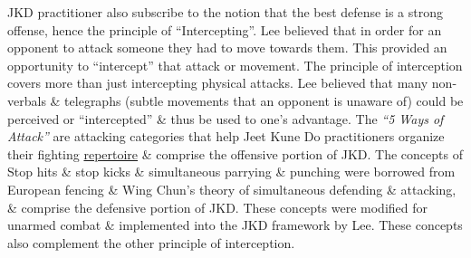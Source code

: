 \documentclass{article}
\begin{document}
JKD practitioner also subscribe to the notion that the best defense is a strong offense, hence the principle of ``Intercepting''. {\sc Lee} believed that in order for an opponent to attack someone they had to move towards them. This provided an opportunity to ``intercept'' that attack or movement. The principle of interception covers more than just intercepting physical attacks. {\sc Lee} believed that many non-verbals \& telegraphs (subtle movements that an opponent is unaware of) could be perceived or ``intercepted'' \& thus be used to one's advantage. The {\it``5 Ways of Attack''} are attacking categories that help Jeet Kune Do practitioners organize their fighting \href{https://en.wikipedia.org/wiki/Repertoire}{repertoire} \& comprise the offensive portion of JKD. The concepts of Stop hits \& stop kicks \& simultaneous parrying \& punching were borrowed from European fencing \& Wing Chun's theory of simultaneous defending \& attacking, \& comprise the defensive portion of JKD. These concepts were modified for unarmed combat \& implemented into the JKD framework by {\sc Lee}. These concepts also complement the other principle of interception.
\end{document}
